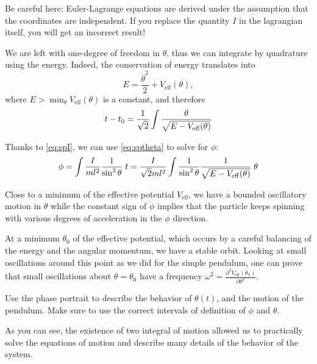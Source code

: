 \documentclass[english,fontsize=11pt,paper=a5,oneside]{scrbook}
\let\d\relax
\newcommand{\d}{\mathrm{d}}
\theoremstyle{definition}
\newenvironment{remark}
  {\pushQED{\qed}\renewcommand{\qedsymbol}{$\lozenge$}\remarkx}
  {\popQED\endremarkx}
\newenvironment{exercise}
  {\pushQED{\qed}\renewcommand{\qedsymbol}{$\maltese$}\exercisex}
  {\popQED\endexercisex}
\begin{document}
\begin{remark}
  Be careful here: Euler-Lagrange equations are derived under the assumption that the coordinates are independent. If you replace the quantity $I$ in the lagrangian itself, you will get an incorrect result!
\end{remark}

We are left with one-degree of freedom in $\theta$, thus we can integrate by quadrature using the energy.
Indeed, the conservation of energy translates into
\begin{equation}
  E = \frac{\dot \theta^2}2 + V_{\mathrm{eff}}(\theta),
\end{equation}
where $E>\min_\theta V_{\mathrm{eff}}(\theta)$ is a constant, and therefore
\begin{equation}\label{eq:sptheta}
  t - t_0 = \frac1{\sqrt2}\int\frac{\d \theta}{\sqrt{E - V_{\mathrm{eff}}(\theta)}}
\end{equation}

Thanks to \eqref{eq:spI}, we can use \eqref{eq:sptheta} to solve for $\phi$:
\begin{equation}
  \phi = \int \frac{I}{ml^2} \frac1{\sin^2\theta} \;\d t
  = \frac{I}{\sqrt{2} m l^2}  \int \frac1{\sin^2\theta} \frac{1}{\sqrt{E - V_{\mathrm{eff}}(\theta)}}\; \d \theta
\end{equation}

Close to a minimum of the effective potential $V_{\mathrm{eff}}$, we have a bounded oscillatory motion in $\theta$ while the constant sign of $\dot\phi$ implies that the particle keeps spinning with various degrees of acceleration in the $\phi$ direction.

At a minimum $\theta_0$ of the effective potential, which occurs by a careful balancing of the energy and the angular momentum, we have a stable orbit.
Looking at small oscillations around this point as we did for the simple pendulum, one can prove that small oscillations about $\theta = \theta_0$ have a frequency $\omega^2 = \frac{\partial^2 V_{\mathrm{eff}}(\theta_0)}{\partial\theta^2}$.

\begin{exercise}
  Use the phase portrait to describe the behavior of $\theta(t)$, and the motion of the pendulum. Make sure to use the correct intervals of definition of $\phi$ and $\theta$.
\end{exercise}

As you can see, the existence of two integral of motion allowed us to practically solve the equations of motion and describe many details of the behavior of the system.
\end{document}
